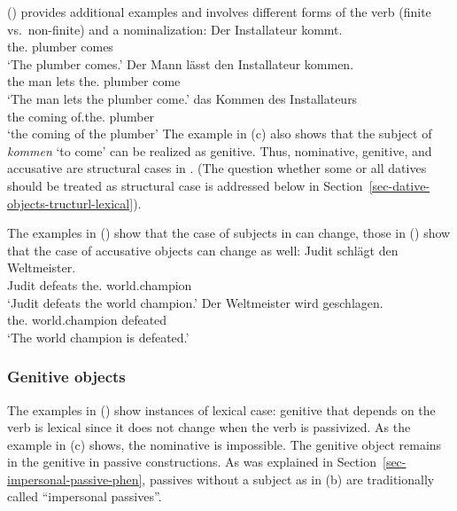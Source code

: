 () provides additional examples and involves different forms of the verb (finite
vs.\ non-finite) and a nominalization:
\eal
\ex 
\gll Der Installateur kommt.\\
     the.\NOM{} plumber      comes\\
\glt `The plumber comes.'
\ex 
\gll Der Mann lässt den Installateur kommen.\\
     the man  lets the.\ACC{} plumber      come\\
\glt `The man lets the plumber come.'
\ex 
\gll das Kommen des Installateurs\\
     the coming of.the.\GEN{} plumber\\
\glt `the coming of the plumber'
\zl
The example in (c) also shows that the subject of \emph{kommen} `to come' can be realized as
genitive. Thus, nominative, genitive, and accusative are structural cases in . (The question
whether some or all datives should be treated as structural case is addressed below in Section~\ref{sec-dative-objects-tructurl-lexical}).

The examples in () show that the case of subjects in  can change, those in ()
show that the case of accusative objects can change as well:
\eal
\ex 
\gll Judit schlägt den Weltmeister.\\
     Judit defeats the.\ACC{} world.champion\\
\glt `Judit defeats the world champion.'
\ex 
\gll Der        Weltmeister    wird   geschlagen.\\
     the.\NOM{} world.champion \AUX{} defeated\\
\glt `The world champion is defeated.'
\zl

\subsubsection{Genitive objects}

The examples in () show instances of lexical case: genitive that depends on the verb is
lexical since it does not change when the verb is passivized.
\eal
{}
\zl
As the example in (c) shows, the nominative is impossible. The genitive object remains in the
genitive in passive constructions. As was explained in Section~\ref{sec-impersonal-passive-phen},
passives without a subject as in (b) are traditionally called ``impersonal passives''.

